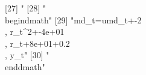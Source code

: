  [27] "%
 [28] "\\begin{dmath}"                                                                                                                                                                                                                                                                                                                                                                                                                                                                                                                                                                                                                               
 [29] "{md_{t}}={umd_{t}}+-2\\, {r_{t}}^{2}+-4e+01\\, {r_{t}}+8e+01+0.2\\, {y_{t}}"                                                                                                                                                                                                                                                                                                                                                                                                                                                                                                                                                                  
 [30] "\\end{dmath}"                                                                                                                                                                                                                                                                                                                                                                                                                                                                                                                                                                                                                                 
